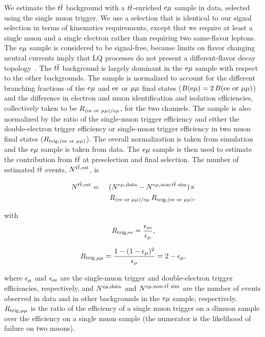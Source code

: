 We estimate the $\relax{t}\overline{\relax{t}}$ background with a $\relax{t}\overline{\relax{t}}$-enriched $\mathrm{e} {\mu}$ sample in data, selected using the single muon trigger.  We use a selection that is identical to our signal selection in terms of kinematics requirements, except that we require at least a single muon and a single electron rather than requiring two same-flavor leptons.   The $\mathrm{e} {\mu}$ sample is considered to be signal-free, because limits on flavor changing neutral currents imply that LQ processes do not present a different-flavor decay topology~\cite{Buchmuller:1986iq,FCNC}. The $\relax{t}\overline{\relax{t}}$ background is largely dominant in the $\mathrm{e} {\mu}$ sample with respect to the other backgrounds.  The sample is normalized to account for the different branching fractions of the $\mathrm{e} {\mu}$ and $\mathrm{e} \mathrm{e}$ or ${\mu} {\mu}$ final states ($B(\mathrm{e} {\mu}) = 2\, B(\mathrm{e} \mathrm{e}\text{ or }{\mu} {\mu})$) and the difference in electron and muon identification and isolation efficiencies, collectively taken to be $R_{(\mathrm{e} \mathrm{e} \text{ or } {\mu} {\mu})/\mathrm{e} {\mu}}$, for the two channels.  The sample is also normalized by the ratio of the single-muon trigger efficiency and either the double-electron trigger efficiency or single-muon trigger efficiency in two muon final states ($R_{\text{trig},(\mathrm{e} \mathrm{e} \text{ or } {\mu} {\mu})}$).  The overall normalization is taken from simulation and the $\mathrm{e} {\mu}$ sample is taken from data.  The $\mathrm{e} {\mu}$ sample is then used to estimate the contribution from $\relax{t}\overline{\relax{t}}$ at preselection and final selection.  The number of estimated $\relax{t}\overline{\relax{t}}$ events, $N^{\relax{t}\overline{\relax{t}}, \text{est}}$, is 

\begin{eqnarray}
N^{\ttbar, \text{est}} &=& (N^{\Pe \Pgm, \text{data}}-N^{\Pe \Pgm, \text{non-}\ttbar \text{ sim}}) \times \nonumber \\
 & & \ \, R_{(\Pe \Pe \text{ or } \Pgm \Pgm)/\Pe \Pgm} \, R_{\text{trig}, (\Pe \Pe \text{ or } \Pgm \Pgm)}
,
\label{eq:ttbar}
\end{eqnarray}

with
\begin{equation}
R_{\text{trig},\Pe \Pe} = \frac{\epsilon_{\Pe \Pe}}{\epsilon_{\Pgm}}
,
\label{eq:ttbarratio}
\end{equation}

\begin{equation}
R_{\text{trig},\Pgm \Pgm } = \frac{1-(1-\epsilon_{\Pgm})^{2}}{\epsilon_{\Pgm}} = 2-\epsilon_{\Pgm}
,
\label{eq:ttbarratiomumu}
\end{equation}

where $\epsilon_{{\mu}}$ and $\epsilon_{\mathrm{e} \mathrm{e}}$ are the single-muon trigger and double-electron trigger efficiencies, respectively, and $N^{\mathrm{e} {\mu}, \text{data}}$ and $N^{\mathrm{e} {\mu}, \text{non-}\relax{t}\overline{\relax{t}} \text{ sim}}$ are the number of events observed in data and in other backgrounds in the $\mathrm{e} {\mu}$ sample, respectively.  $R_{\text{trig},{\mu} {\mu} }$ is the ratio of the efficiency of a single muon trigger on a dimuon sample over the efficiency on a single muon sample (the numerator is the likelihood of failure on two muons).

